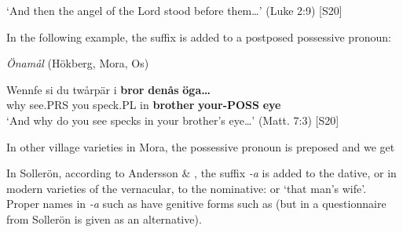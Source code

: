 \glt ‘And then the angel of the Lord stood before them…’ (Luke 2:9) [S20]

\z

In the following example, the suffix is added to a postposed possessive pronoun:


\item 

\textit{Önamål} (Hökberg, Mora, Os)



 \ea\label{}
\gll Wennfe  si  du  twårpär  i  \textbf{bror}\textbf{  denås}\textbf{  öga…}\\


why  see.PRS  you  speck.PL  in  \textbf{brother} \textbf{your-POSS} \textbf{eye}\\

\glt ‘And why do you see specks in your brother’s eye…’ (Matt. 7:3) [S20]

\z

In other village varieties in Mora, the possessive pronoun is preposed and we get 


In Sollerön, according to Andersson \& \citet[357]{Danielsson1999}, the suffix\textit{ {}-a} is added to the dative, or in modern varieties of the vernacular, to the nominative:  or  ‘that man’s wife’. Proper names in\textit{ {}-a} such as  have genitive forms such as (but in a questionnaire from Sollerön  is given as an alternative).


